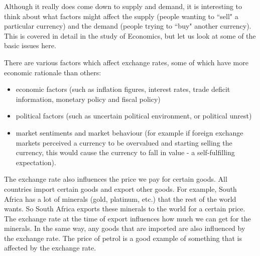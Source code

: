         \label{m39335*id68560}Although it really does come down to supply and demand, it is interesting to think about what factors might affect the supply (people wanting to ``sell" a particular currency) and the demand (people trying to ``buy" another currency). This is covered in detail in the study of Economics, but let us look at some of the basic issues here.\par 
        \label{m39335*id68568}There are various factors which affect exchange rates, some of which have more economic rationale than others:\par 
        \label{m39335*id68573}\begin{itemize}[noitemsep]
            \label{m39335*uid18}\item economic factors (such as inflation figures, interest rates, trade deficit information, monetary policy and fiscal policy)
\label{m39335*uid19}\item political factors (such as uncertain political environment, or political unrest)
\label{m39335*uid20}\item market sentiments and market behaviour (for example if foreign exchange markets perceived a currency to be overvalued and starting selling the currency, this would cause the currency to fall in value - a self-fulfilling expectation).
\end{itemize}
\label{m39335*id7324}The exchange rate also influences the price we pay for certain goods. All countries import certain goods and export other goods. For example, South Africa has a lot of minerals (gold, platinum, etc.) that the rest of the world wants. So South Africa exports these minerals to the world for a certain price. The exchange rate at the time of export influences how much we can get for the minerals. In the same way, any goods that are imported are also influenced by the exchange rate. The price of petrol is a good example of something that is affected by the exchange rate. 
\par 
\label{m39335*secfhsst!!!underscore!!!id876}
